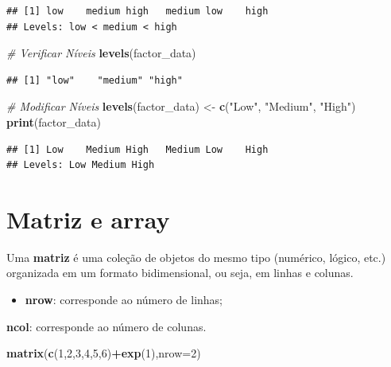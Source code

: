 \documentclass[
]{book}
\newenvironment{Shaded}{\begin{snugshade}}{\end{snugshade}}
\newcommand{\AttributeTok}[1]{\textcolor[rgb]{0.13,0.29,0.53}{#1}}
\newcommand{\CommentTok}[1]{\textcolor[rgb]{0.56,0.35,0.01}{\textit{#1}}}
\newcommand{\DecValTok}[1]{\textcolor[rgb]{0.00,0.00,0.81}{#1}}
\newcommand{\FunctionTok}[1]{\textcolor[rgb]{0.13,0.29,0.53}{\textbf{#1}}}
\newcommand{\NormalTok}[1]{#1}
\newcommand{\OtherTok}[1]{\textcolor[rgb]{0.56,0.35,0.01}{#1}}
\newcommand{\SpecialCharTok}[1]{\textcolor[rgb]{0.81,0.36,0.00}{\textbf{#1}}}
\newcommand{\StringTok}[1]{\textcolor[rgb]{0.31,0.60,0.02}{#1}}
\providecommand{\tightlist}{%
  \setlength{\itemsep}{0pt}\setlength{\parskip}{0pt}}
\theoremstyle{definition}
\theoremstyle{definition}
\theoremstyle{definition}
\theoremstyle{definition}
\theoremstyle{remark}
\begin{document}
\begin{verbatim}
## [1] low    medium high   medium low    high  
## Levels: low < medium < high
\end{verbatim}

\begin{Shaded}
\begin{Highlighting}[]
\CommentTok{\# Verificar Níveis}
\FunctionTok{levels}\NormalTok{(factor\_data)}
\end{Highlighting}
\end{Shaded}

\begin{verbatim}
## [1] "low"    "medium" "high"
\end{verbatim}

\begin{Shaded}
\begin{Highlighting}[]
\CommentTok{\# Modificar Níveis}
\FunctionTok{levels}\NormalTok{(factor\_data) }\OtherTok{\textless{}{-}} \FunctionTok{c}\NormalTok{(}\StringTok{"Low"}\NormalTok{, }\StringTok{"Medium"}\NormalTok{, }\StringTok{"High"}\NormalTok{)}
\FunctionTok{print}\NormalTok{(factor\_data)}
\end{Highlighting}
\end{Shaded}

\begin{verbatim}
## [1] Low    Medium High   Medium Low    High  
## Levels: Low Medium High
\end{verbatim}

\chapter{Matriz e array}\label{matriz-e-array}

Uma \textbf{matriz} é uma coleção de objetos do mesmo tipo (numérico, lógico, etc.) organizada em um formato bidimensional, ou seja, em linhas e colunas.

\begin{itemize}
\tightlist
\item
  \textbf{nrow}: corresponde ao número de linhas;
\end{itemize}

\textbf{ncol}: corresponde ao número de colunas.

\begin{Shaded}
\begin{Highlighting}[]
\FunctionTok{matrix}\NormalTok{(}\FunctionTok{c}\NormalTok{(}\DecValTok{1}\NormalTok{,}\DecValTok{2}\NormalTok{,}\DecValTok{3}\NormalTok{,}\DecValTok{4}\NormalTok{,}\DecValTok{5}\NormalTok{,}\DecValTok{6}\NormalTok{)}\SpecialCharTok{+}\FunctionTok{exp}\NormalTok{(}\DecValTok{1}\NormalTok{),}\AttributeTok{nrow=}\DecValTok{2}\NormalTok{)}
\end{Highlighting}
\end{Shaded}
\end{document}
